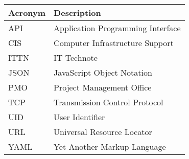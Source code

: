 \addtocounter{table}{-1}
\begin{longtable}{p{}p{}}\hline
\textbf{Acronym} & \textbf{Description}  \\\hline

API & Application Programming Interface \\\hline
CIS & Computer Infrastructure Support \\\hline
ITTN & IT Technote \\\hline
JSON & JavaScript Object Notation \\\hline
PMO & Project Management Office \\\hline
TCP & Transmission Control Protocol \\\hline
UID & User Identifier \\\hline
URL & Universal Resource Locator \\\hline
YAML & Yet Another Markup Language \\\hline
\end{longtable}
